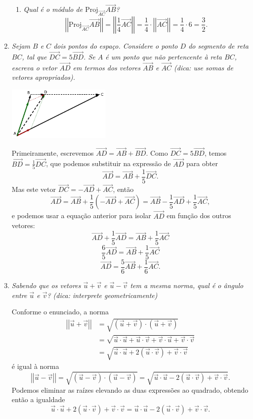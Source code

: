 \documentclass[12pt,a4paper]{article}
\newcommand{\vect}[1]{\overrightarrow{#1}}
\newcommand{\norm}[1]{\left|\left|{#1}\right|\right|}
\begin{document}
\begin{enumerate}
\begin{enumerate}
\item \textit{Qual é o módulo de $\text{Proj}_{\vect{AC}}\vect{AB}$?}
\[
 \norm{\text{Proj}_{\vect{AC}}\vect{AB}}
= \norm{\frac{1}{4}\vect{AC}}
= \frac{1}{4} \cdot \norm{\vect{AC}}
= \frac{1}{4} \cdot 6
= \frac{3}{2}.
\]
\end{enumerate}
\item \textit{Sejam $B$ e $C$ dois pontos do espaço. Considere o ponto $D$ do segmento de reta $BC$, tal que $\vect{DC} = 5 \vect{BD}$. Se $A$ é um ponto que não pertencente à reta $BC$, escreva o vetor $\vect{AD}$ em termos dos vetores $\vect{AB}$ e $\vect{AC}$ (dica: use somas de vetores apropriados).}

\includegraphics[width=5.0cm]{img/prova-1-pro-fig1b}

Primeiramente, escrevemos $\vect{AD} = \vect{AB} + \vect{BD}$. Como $\vect{DC} = 5 \vect{BD}$, temos $\vect{BD} = \frac{1}{5} \vect{DC}$, que podemos substituir na expressão de $\vect{AD}$ para obter
\[
\vect{AD} = \vect{AB} + \frac{1}{5} \vect{DC}.
\]
Mas este vetor $\vect{DC} = -\vect{AD} + \vect{AC}$, então
\[
\vect{AD} = \vect{AB} + \frac{1}{5} (-\vect{AD} + \vect{AC})
          = \vect{AB} - \frac{1}{5} \vect{AD} + \frac{1}{5} \vect{AC},
\]
e podemos usar a equação anterior para isolar $\vect{AD}$ em função dos outros vetores:
\[
\vect{AD} + \frac{1}{5} \vect{AD} = \vect{AB} + \frac{1}{5} \vect{AC}
\]
\[
\frac{6}{5} \vect{AD} = \vect{AB} + \frac{1}{5} \vect{AC}
\]
\[
\vect{AD} = \frac{5}{6} \vect{AB} + \frac{1}{6} \vect{AC}.
\]

\item \textit{Sabendo que os vetores $\vec{u} + \vec{v}$ e $\vec{u} - \vec{v}$ tem a mesma norma, qual é o ângulo entre $\vec{u}$ e $\vec{v}$? (dica: interprete geometricamente)}

Conforme o enunciado, a norma
\begin{align*}
\norm{\vec{u} + \vec{v}}
& = \sqrt{(\vec{u} + \vec{v}) \cdot (\vec{u} + \vec{v})} \\
& = \sqrt{
    \vec{u} \cdot \vec{u}
  + \vec{u} \cdot \vec{v}
  + \vec{v} \cdot \vec{u}
  + \vec{v} \cdot \vec{v}
} \\
& = \sqrt{
    \vec{u} \cdot \vec{u}
  + 2 (\vec{u} \cdot \vec{v})
  + \vec{v} \cdot \vec{v}
}
\end{align*}
é igual à norma
\[
\norm{\vec{u} - \vec{v}}
= \sqrt{(\vec{u} - \vec{v}) \cdot (\vec{u} - \vec{v})}
= \sqrt{
    \vec{u} \cdot \vec{u}
  - 2 (\vec{u} \cdot \vec{v})
  + \vec{v} \cdot \vec{v}
}.
\]
Podemos eliminar as raízes elevando as duas expressões ao quadrado, obtendo então a igualdade
\[
  \vec{u} \cdot \vec{u}
+ 2 (\vec{u} \cdot \vec{v})
+ \vec{v} \cdot \vec{v}
=
  \vec{u} \cdot \vec{u}
- 2(\vec{u} \cdot \vec{v})
+ \vec{v} \cdot \vec{v}.
\]


\end{enumerate}
\end{document}
